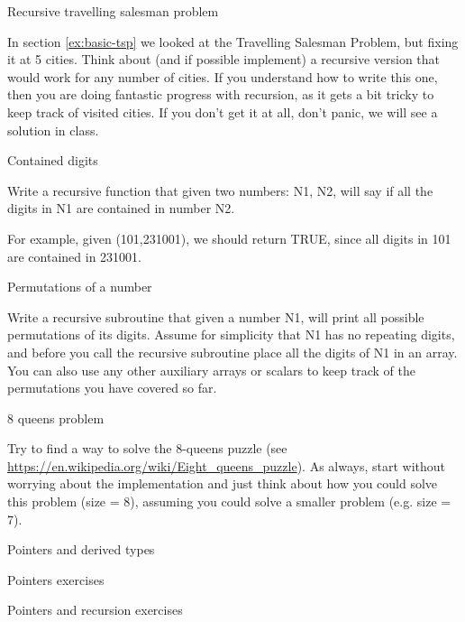  {Recursive travelling salesman problem}
\label{ex:rec-tsp}

In section \ref{ex:basic-tsp} we looked at the Travelling Salesman Problem, but fixing it
 at 5 cities. Think about (and if possible implement) a recursive version that
 would work for any number of cities. If you understand how to write this one,
 then you are doing fantastic progress with recursion, as it gets a bit tricky
 to keep track of visited cities. If you don't get it at all, don't panic, we
 will see a solution in class.


 {Contained digits}
\label{ex:rec-elf}

Write a recursive function that given two numbers: N1, N2, will say if all the
digits in N1 are contained in number N2.

For example, given (101,231001), we should return TRUE, since all digits in 101
are contained in 231001.

 {Permutations of a number}
\label{ex:rec-perm}

Write a recursive subroutine that given a number N1, will print all possible
permutations of its digits. Assume for simplicity that N1 has no repeating
digits, and before you call the recursive subroutine place all the digits of N1
in an array. You can also use any other auxiliary arrays or scalars to keep
track of the permutations you have covered so far.

 {8 queens problem}
\label{ex:rec-queens}

Try to find a way to solve the 8-queens puzzle (see
\url{https://en.wikipedia.org/wiki/Eight_queens_puzzle}). As always, start
without worrying about the implementation and just think about how you could
solve this problem (size = 8), assuming you could solve a smaller problem
(e.g. size = 7).

 
 {Pointers and derived types}
{}

 {Pointers exercises}
\label{sec:pointers-exercises}

 {Pointers and recursion exercises}
\label{sec:pointers-recursion-exercises}



